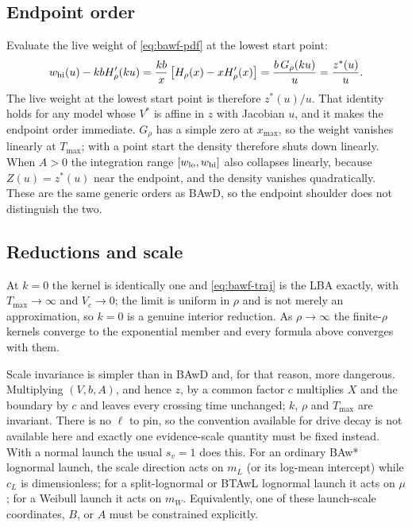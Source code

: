 \documentclass[12pt]{article}
\theoremstyle{remark}
\begin{document}
\subsection{Endpoint order}
Evaluate the live weight of \eqref{eq:bawf-pdf} at the lowest start point:
\begin{equation}
  w_{\rm hi}(u) - k b H_\rho'(ku)
  = \frac{kb}{x}\left[H_\rho(x) - xH_\rho'(x)\right]
  = \frac{b\,G_\rho(ku)}{u}
  = \frac{z^{*}(u)}{u}.
  \label{eq:bawf-weight}
\end{equation}
The live weight at the lowest start point is therefore $z^{*}(u)/u$. That identity holds for any model whose $V^{*}$ is affine in $z$ with Jacobian $u$, and it makes the endpoint order immediate. $G_\rho$ has a simple zero at $x_{\max}$, so the weight vanishes linearly at $T_{\max}$; with a point start the density therefore shuts down linearly. When $A>0$ the integration range $[w_{\rm lo},w_{\rm hi}]$ also collapses linearly, because $Z(u)=z^{*}(u)$ near the endpoint, and the density vanishes quadratically. These are the same generic orders as BAwD, so the endpoint shoulder does not distinguish the two.

\subsection{Reductions and scale}
At $k=0$ the kernel is identically one and \eqref{eq:bawf-traj} is the LBA exactly, with $T_{\max}\to\infty$ and $V_c\to0$; the limit is uniform in $\rho$ and is not merely an approximation, so $k=0$ is a genuine interior reduction. As $\rho\to\infty$ the finite-$\rho$ kernels converge to the exponential member and every formula above converges with them.

Scale invariance is simpler than in BAwD and, for that reason, more dangerous. Multiplying $(V,b,A)$, and hence $z$, by a common factor $c$ multiplies $X$ and the boundary by $c$ and leaves every crossing time unchanged; $k$, $\rho$ and $T_{\max}$ are invariant. There is no $\ell$ to pin, so the convention available for drive decay is not available here and exactly one evidence-scale quantity must be fixed instead. With a normal launch the usual $s_v=1$ does this. For an ordinary BAw* lognormal launch, the scale direction acts on $m_L$ (or its log-mean intercept) while $c_L$ is dimensionless; for a split-lognormal or BTAwL lognormal launch it acts on $\mu$; for a Weibull launch it acts on $m_W$. Equivalently, one of these launch-scale coordinates, $B$, or $A$ must be constrained explicitly.
\end{document}
